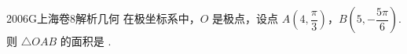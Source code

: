 
\begin{problem}{2006}{G}{上海卷}{8}{解析几何}
在极坐标系中，$ O $ 是极点，设点 $ A\left(4, \dfrac{\pi}{3}\right) $，$ B\left(5, -\dfrac{5\pi}{6}\right) $.则 $ \triangle OAB $ 的面积是 \underline{\hspace{4em}}.
\end{problem}

\begin{answer}

\end{answer}

\begin{solutions}

\end{solutions}